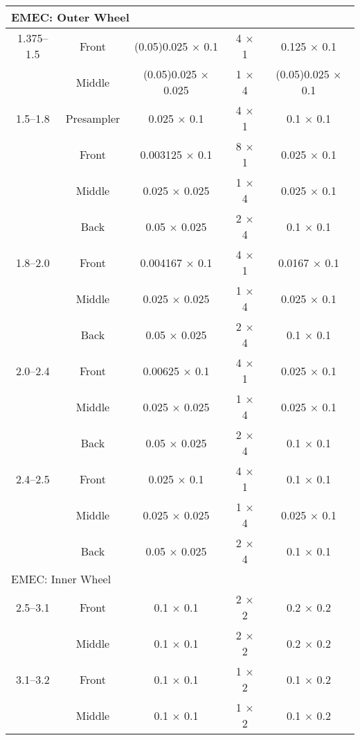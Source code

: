 \documentclass[cernpreprint, atlasdraft=false, UKenglish,british,orcidlogo, texmf, orcidlogo]{atlasdoc}
\begin{document}
\begin{table}[p]
\begin{center}
\begin{tabular}{|c|c||c||c|c|}
\multicolumn{5}{|l|}{\gls{EMEC}: Outer Wheel} \\
\hline
1.375--1.5   & Front      & (0.05)0.025 $\times$ 0.1 & 4 $\times$ 1 & 0.125 $\times$ 0.1 \\
& Middle     & (0.05)0.025 $\times$ 0.025  & 1 $\times$ 4 &(0.05)0.025 $\times$ 0.1 \\
\hline
1.5--1.8      & Presampler & 0.025 $\times$ 0.1    & 4 $\times$ 1 & 0.1 $\times$ 0.1 \\
& Front      & 0.003125 $\times$ 0.1 & 8 $\times$ 1 & 0.025 $\times$ 0.1 \\
& Middle     & 0.025 $\times$ 0.025  & 1 $\times$ 4 & 0.025 $\times$ 0.1 \\
& Back       & 0.05  $\times$ 0.025  & 2 $\times$ 4 & 0.1 $\times$ 0.1 \\
\hline
1.8--2.0              & Front      & 0.004167 $\times$ 0.1 & 4 $\times$ 1 & 0.0167 $\times$ 0.1 \\
& Middle     & 0.025 $\times$ 0.025  & 1 $\times$ 4 & 0.025 $\times$ 0.1 \\
& Back       & 0.05  $\times$ 0.025  & 2 $\times$ 4 & 0.1 $\times$ 0.1  \\
\hline
2.0--2.4              & Front      & 0.00625 $\times$ 0.1 & 4 $\times$ 1 & 0.025 $\times$ 0.1  \\
& Middle     & 0.025 $\times$ 0.025  & 1 $\times$ 4 & 0.025 $\times$ 0.1 \\
& Back       & 0.05  $\times$ 0.025  & 2 $\times$ 4 & 0.1 $\times$ 0.1 \\
\hline
 
2.4--2.5             & Front      & 0.025 $\times$ 0.1 & 4 $\times$ 1 & 0.1 $\times$ 0.1  \\
& Middle     & 0.025 $\times$ 0.025  & 1 $\times$ 4 & 0.025 $\times$ 0.1 \\
& Back       & 0.05  $\times$ 0.025  & 2 $\times$ 4 & 0.1 $\times$ 0.1 \\
\hline
\multicolumn{5}{|l|}{\gls{EMEC}: Inner Wheel} \\
\hline
2.5--3.1             & Front      & 0.1 $\times$ 0.1 & 2 $\times$ 2 & 0.2 $\times$ 0.2  \\
& Middle     & 0.1 $\times$ 0.1  & 2 $\times$ 2 & 0.2 $\times$ 0.2  \\
 
\hline
3.1--3.2             & Front      & 0.1 $\times$ 0.1 & 1 $\times$ 2 & 0.1 $\times$ 0.2  \\
& Middle     & 0.1 $\times$ 0.1  & 1 $\times$ 2 & 0.1 $\times$ 0.2  \\
 

\end{tabular}
\end{center}
\end{table}
\end{document}
